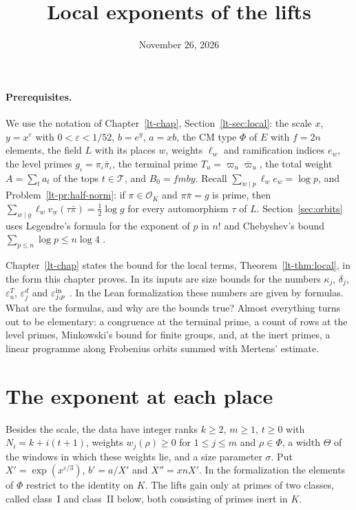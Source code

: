 \documentclass[reqno]{amsart}
\title{Local exponents of the lifts}
\author{}
\date{November 26, 2026}
\newcounter{chap}
\theoremstyle{definition}
\theoremstyle{plain}
\theoremstyle{remark}
\newcommand{\Oc}{\mathcal O}
\newcommand{\Tc}{\mathcal T}
\begin{document}
\maketitle
{}\label{chap}

\paragraph{Prerequisites.}
We use the notation of Chapter~\ref{lt-chap}, Section~\ref{lt-sec:local}: the scale \(x\), \(y=x^\varepsilon\) with \(0<\varepsilon<1/52\), \(b=e^y\), \(a=xb\), the CM type \(\Phi\) of \(E\) with \(f=2n\) elements, the field \(L\) with its places \(w\), weights \(\ell_w\) and ramification indices \(e_w\), the level primes \(g_\iota=\pi_\iota\bar\pi_\iota\), the terminal prime \(T_u=\varpi_u\bar\varpi_u\), the total weight \(A=\sum_ta_t\) of the tops \(t\in\Tc\), and \(B_0=fmby\).  Recall \(\sum_{w\mid p}\ell_we_w=\log p\), and Problem~\ref{lt-pr:half-norm}: if \(\pi\in\Oc_K\) and \(\pi\bar\pi=g\) is prime, then \(\sum_{w\mid g}\ell_wv_w(\tau\bar\pi)=\tfrac12\log g\) for every automorphism \(\tau\) of \(L\).  Section~\ref{sec:orbits} uses Legendre's formula for the exponent of \(p\) in \(n!\) and Chebyshev's bound \(\sum_{p\le n}\log p\le n\log4\) \cite[Ch.~2]{AZ}.

Chapter~\ref{lt-chap} states the bound for the local terms, Theorem~\ref{lt-thm:local}, in the form this chapter proves.  In \cite[Thm.~16.6]{Adr} its inputs are size bounds for the numbers \(\kappa_j\), \(\delta_j\), \(\varepsilon^T_u\), \(\varepsilon^d_j\) and \(\varepsilon^{\rm in}_{j,p}\) \cite[(E1)--(E6), Hyps.~16.13--16.14]{Adr}.  In the Lean formalization \cite{Lean} these numbers are given by formulas.  What are the formulas, and why are the bounds true?  Almost everything turns out to be elementary: a congruence at the terminal prime, a count of rows at the level primes, Minkowski's bound for finite groups, and, at the inert primes, a linear programme along Frobenius orbits summed with Mertens' estimate.

\section{The exponent at each place}\label{sec:def}

Besides the scale, the data have integer ranks \(k\ge2\), \(m\ge1\), \(t\ge0\) with \(N_i=k+i(t+1)\), weights \(w_j(\rho)\ge0\) for \(1\le j\le m\) and \(\rho\in\Phi\), a width \(\Theta\) of the windows in which these weights lie, and a size parameter \(\sigma\).  Put \(X'=\exp(x^{\varepsilon/3})\), \(b'=a/X'\) and \(X''=xnX'\).  In the formalization the elements of \(\Phi\) restrict to the identity on \(K\).  The lifts gain only at primes of two classes, called class~I and class~II below, both consisting of primes inert in \(K\).
\end{document}
